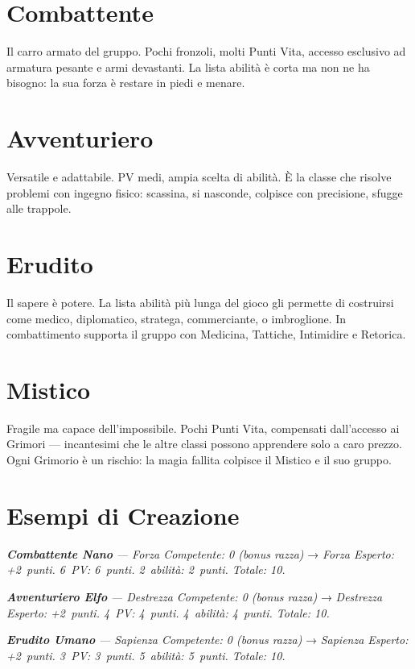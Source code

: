 \documentclass[10pt,a4paper]{article}
\begin{document}
\section*{Combattente}

Il carro armato del gruppo. Pochi fronzoli, molti Punti Vita, accesso esclusivo ad armatura pesante e armi devastanti. La lista abilità è corta ma non ne ha bisogno: la sua forza è restare in piedi e menare.


\section*{Avventuriero}

Versatile e adattabile. PV medi, ampia scelta di abilità. È la classe che risolve problemi con ingegno fisico: scassina, si nasconde, colpisce con precisione, sfugge alle trappole.


\section*{Erudito}

Il sapere è potere. La lista abilità più lunga del gioco gli permette di costruirsi come medico, diplomatico, stratega, commerciante, o imbroglione. In combattimento supporta il gruppo con Medicina, Tattiche, Intimidire e Retorica.


\section*{Mistico}

Fragile ma capace dell'impossibile. Pochi Punti Vita, compensati dall'accesso ai Grimori — incantesimi che le altre classi possono apprendere solo a caro prezzo. Ogni Grimorio è un rischio: la magia fallita colpisce il Mistico e il suo gruppo.


\section*{Esempi di Creazione}

\textbf{\textit{Combattente Nano}}\textit{ — Forza Competente: 0 (bonus razza) }→\textit{ Forza Esperto: +2~punti. 6~PV: 6~punti. 2~abilità: 2~punti. Totale: 10.}


\textbf{\textit{Avventuriero Elfo}}\textit{ — Destrezza Competente: 0 (bonus razza) }→\textit{ Destrezza Esperto: +2~punti. 4~PV: 4~punti. 4~abilità: 4~punti. Totale: 10.}


\textbf{\textit{Erudito Umano}}\textit{ — Sapienza Competente: 0 (bonus razza) }→\textit{ Sapienza Esperto: +2~punti. 3~PV: 3~punti. 5~abilità: 5~punti. Totale: 10.}
\end{document}
